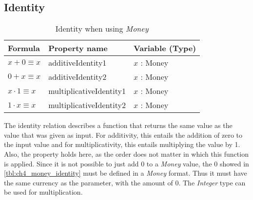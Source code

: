 \subsection*{Identity}
\label{ssct:properties_identity}
\begin{table}[!ht]
\centering
\begin{tabular}{lll}
\hline
                        \textbf{Formula}     & \textbf{Property name}  & \textbf{Variable (Type)} \\ \hline
\rowcolor[HTML]{EFEFEF} $x + 0 \equiv x$     & additiveIdentity1       & $x$ : Money              \\
						            $0 + x \equiv x$     & additiveIdentity2       & $x$ : Money              \\
\rowcolor[HTML]{EFEFEF} $x \cdot 1 \equiv x$ & multiplicativeIdentity1 & $x$ : Money              \\
                        $1 \cdot x \equiv x$ & multiplicativeIdentity2 & $x$ : Money              \\ \hline
\end{tabular}
\caption{Identity when using \textit{Money}}
\label{tbl:ch4_money_identity}
\end{table}
\FloatBarrier\noindent
The identity relation describes a function that returns the same value as the
value that was given as input. For additivity, this entails the addition of zero
to the input value and for multiplicativity, this entails multiplying the value
by 1. Also, the  property holds here, as
the order does not matter in which this function is applied. Since it is not
possible to just add 0 to a \textit{Money} value, the 0 showed in
\autoref{tbl:ch4_money_identity} must be defined in a \textit{Money} format.
Thus it must have the same currency as the parameter, with the amount of 0. The
\textit{Integer} type can be used for multiplication.

